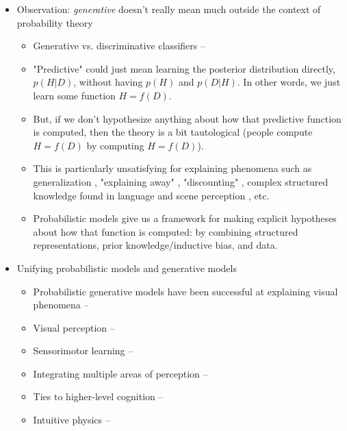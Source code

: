 \documentclass[12pt]{article}
\begin{document}
\begin{itemize}
\item Observation: \textit{generative} doesn't really mean much outside the context of probability theory
    \begin{itemize}
    \item Generative vs. discriminative classifiers -- \citep{Ng2002}
    \item "Predictive" could just mean learning the posterior distribution directly, $p(H|D)$, without having $p(H)$ and $p(D|H)$. In other words, we just learn some function $H=f(D)$.
    \item But, if we don't hypothesize anything about how that predictive function is computed, then the theory is a bit tautological (people compute $H=f(D)$ by computing $H=f(D)$).
    \item This is particularly unsatisfying for explaining phenomena such as generalization \citep{Tenenbaum2001}, "explaining away" \citep{Battaglia2012}, "discounting" \citep{Battaglia2012}, complex structured knowledge found in language and scene perception \citep{Griffiths2010}, etc.
    \item Probabilistic models give us a framework for making explicit hypotheses about how that function is computed: by combining structured representations, prior knowledge/inductive bias, and data.
    \end{itemize}

\item Unifying probabilistic models and generative models
    \begin{itemize}
    \item Probabilistic generative models have been successful at explaining visual phenomena -- \citep{Battaglia2012}
    \item Visual perception -- \citep{Weiss2002}
    \item Sensorimotor learning -- \citep{Kording2004}
    \item Integrating multiple areas of perception -- \citep{Ernst2002}
    \item Ties to higher-level cognition -- \citep{Yuille2006}
    \item Intuitive physics -- \citep{Teglas2011}
    \end{itemize}

\end{itemize}

\end{document}
